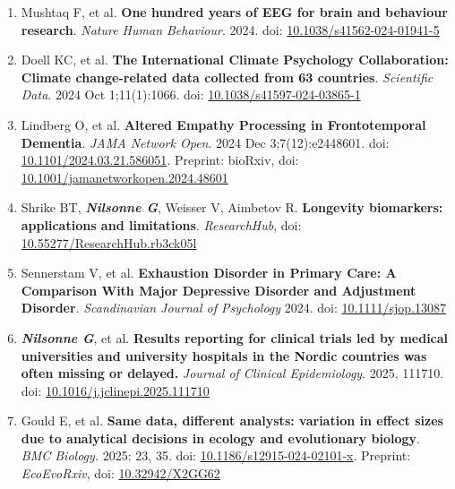 \documentclass[10pt]{article}
\begin{document}
\begin{enumerate}[nolistsep]
 \href{https://doi.org/10.31234/osf.io/mxje3}{10.31234/osf.io/mxje3}
\item Mushtaq F, et al. \textbf{One hundred years of EEG for brain and behaviour research}. \emph{Nature Human Behaviour}. 2024. doi: \href{https://doi.org/10.1038/s41562-024-01941-5}{10.1038/s41562-024-01941-5}
\item Doell KC, et al. \textbf{The International Climate Psychology Collaboration: Climate change-related data collected from 63 countries}. \emph{Scientific Data}. 2024 Oct 1;11(1):1066. doi: \href{https://doi.org/10.1038/s41597-024-03865-1}{10.1038/s41597-024-03865-1}
\item Lindberg O, et al. \textbf{Altered Empathy Processing in Frontotemporal Dementia}. \emph{JAMA Network Open}. 2024 Dec 3;7(12):e2448601. doi: \href{https://doi.org/10.1101/2024.03.21.586051}{10.1101/2024.03.21.586051}. Preprint: bioRxiv, doi: \href{https://doi.org/10.1001/jamanetworkopen.2024.48601}{10.1001/jamanetworkopen.2024.48601}
\item Shrike BT, \textbf{\textit{Nilsonne G}}, Weisser V, Aimbetov R. \textbf{Longevity biomarkers: applications and limitations}. \emph{ResearchHub}, doi: \href{https://doi.org/10.55277/ResearchHub.rb3ck05l}{10.55277/ResearchHub.rb3ck05l}
\item Sennerstam V, et al. \textbf{Exhaustion Disorder in Primary Care: A Comparison With Major Depressive Disorder and Adjustment Disorder}. \emph{Scandinavian Journal of Psychology} 2024. doi: \href{https://doi.org/10.1111/sjop.13087}{10.1111/sjop.13087}
\item \textbf{\textit{Nilsonne G}}, et al. \textbf{Results reporting for clinical trials led by medical universities and university hospitals in the Nordic countries was often missing or delayed.} \emph{Journal of Clinical Epidemiology}. 2025, 111710. doi: \href{https://doi.org/10.1016/j.jclinepi.2025.111710}{10.1016/j.jclinepi.2025.111710}
\item Gould E, et al. \textbf{Same data, different analysts: variation in effect sizes due to analytical decisions in ecology and evolutionary biology}. \emph{BMC Biology.} 2025: 23, 35. doi: \href{https://doi.org/10.1186/s12915-024-02101-x}{10.1186/s12915-024-02101-x}. Preprint: \emph{EcoEvoRxiv}, doi: \href{https://doi.org/10.32942/X2GG62}{10.32942/X2GG62}

\end{enumerate}
\end{document}
